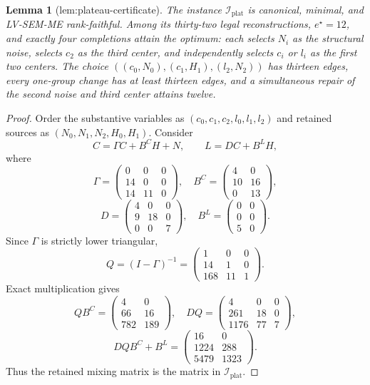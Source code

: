 \documentclass{article}
\newtheorem{lemma}{Lemma}
\begin{document}
\begin{lemma}[lem:plateau-certificate]\label{lem:plateau-certificate}
The instance \(\mathcal I_{\mathrm{plat}}\) is canonical, minimal, and LV-SEM-ME rank-faithful. Among its thirty-two legal reconstructions, \(e^{\star}=12\), and exactly four completions attain the optimum: each selects \(N_i\) as the structural noise, selects \(c_2\) as the third center, and independently selects \(c_i\) or \(l_i\) as the first two centers. The choice \(((c_0,N_0),(c_1,H_1),(l_2,N_2))\) has thirteen edges, every one-group change has at least thirteen edges, and a simultaneous repair of the second noise and third center attains twelve.
\end{lemma}
\begin{proof}
Order the substantive variables as \((c_0,c_1,c_2,l_0,l_1,l_2)\) and retained sources as \((N_0,N_1,N_2,H_0,H_1)\). Consider
\[
C=\Gamma C+B^CH+N,\qquad L=DC+B^LH,
\]
where
\[
\Gamma=\begin{pmatrix}0&0&0\\14&0&0\\14&11&0\end{pmatrix},
\quad B^C=\begin{pmatrix}4&0\\10&16\\0&13\end{pmatrix},
\]
\[
D=\begin{pmatrix}4&0&0\\9&18&0\\0&0&7\end{pmatrix},
\quad B^L=\begin{pmatrix}0&0\\0&0\\5&0\end{pmatrix}.
\]
Since \(\Gamma\) is strictly lower triangular,
\[
Q=(I-\Gamma)^{-1}=\begin{pmatrix}1&0&0\\14&1&0\\168&11&1\end{pmatrix}.
\]
Exact multiplication gives
\[
QB^C=\begin{pmatrix}4&0\\66&16\\782&189\end{pmatrix},
\quad DQ=\begin{pmatrix}4&0&0\\261&18&0\\1176&77&7\end{pmatrix},
\]
\[
DQB^C+B^L=\begin{pmatrix}16&0\\1224&288\\5479&1323\end{pmatrix}.
\]
Thus the retained mixing matrix is the matrix in \(\mathcal I_{\mathrm{plat}}\).


\end{proof}
\end{document}
